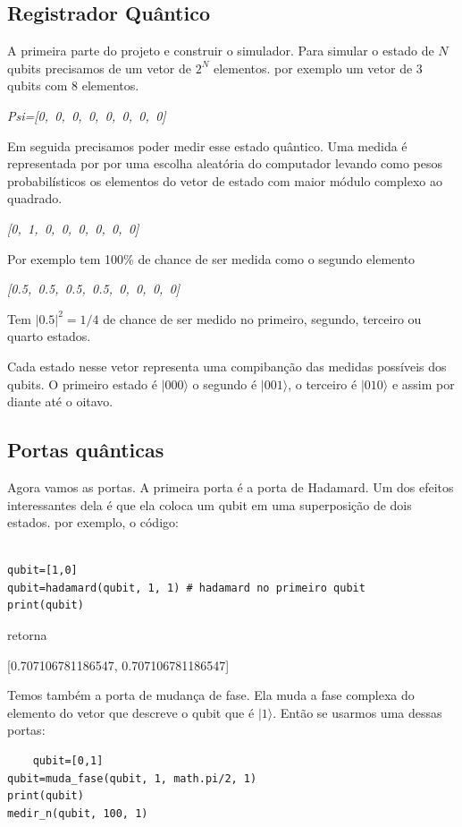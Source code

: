\documentclass[12pt,a4paper]{article}
\begin{document}
\subsection{Registrador Quântico}
A primeira parte do projeto e construir o simulador. Para simular o estado de $N$ qubits precisamos de um vetor de  $2^{N}$ elementos.
por exemplo um vetor de 3 qubits com 8 elementos.


\emph{ Psi=[0,\, 0,\, 0,\, 0,\, 0,\, 0,\, 0,\, 0]}

Em seguida precisamos poder medir esse estado quântico. Uma medida é representada por por uma escolha aleatória do computador levando como pesos probabilísticos os elementos do vetor de estado com maior módulo complexo ao quadrado.

\emph{[0,\, 1,\, 0,\, 0,\, 0,\, 0,\, 0,\, 0]}

Por exemplo tem 100\% de chance de ser medida como o segundo elemento

\emph{[0.5,\, 0.5,\, 0.5,\, 0.5,\, 0,\, 0,\, 0,\, 0]}

Tem $|0.5|^{2}=1/4$ de chance de ser medido no primeiro, segundo, terceiro ou quarto estados.

Cada estado nesse vetor representa uma compibanção das medidas possíveis dos qubits. O primeiro estado é $|000\rangle$ o segundo é $|001\rangle$, o terceiro é $|010\rangle$ e assim por diante até o oitavo.
\subsection{Portas quânticas}
Agora vamos as portas. A primeira porta é a porta de Hadamard. Um dos efeitos interessantes dela é que ela coloca um qubit em uma superposição de dois estados. 
por exemplo, o código:
\begin{verbatim}
    
qubit=[1,0]
qubit=hadamard(qubit, 1, 1) # hadamard no primeiro qubit
print(qubit)

\end{verbatim}

retorna

[0.707106781186547, 0.707106781186547]

Temos também a porta de mudança de fase. Ela muda a fase complexa do elemento do vetor que descreve o qubit que é $|1\rangle$.
Então se usarmos uma dessas portas:

\begin{verbatim}
    qubit=[0,1]
qubit=muda_fase(qubit, 1, math.pi/2, 1)
print(qubit)
medir_n(qubit, 100, 1)
\end{verbatim}
\end{document}
